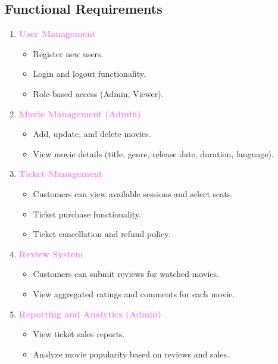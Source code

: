 \documentclass[a4paper,12pt]{article}  %
\renewcommand{\textbf}[1]{\textcolor{violet}{\bfseries #1}}
\begin{document}
\subsection{Functional Requirements}

\begin{enumerate}
    \item \textbf{User Management}
    \begin{itemize}
        \item Register new users.
        \item Login and logout functionality.
        \item Role-based access (Admin, Viewer).
    \end{itemize}
    
    
    \item \textbf{Movie Management (Admin)}
    \begin{itemize}
        \item Add, update, and delete movies.
        \item View movie details (title, genre, release date, duration, language).
    \end{itemize}
    
    
    \item \textbf{Ticket Management}
    \begin{itemize}
        \item Customers can view available sessions and select seats.
        \item Ticket purchase functionality.
        \item Ticket cancellation and refund policy.
    \end{itemize}
    
    \item \textbf{Review System}
    \begin{itemize}
        \item Customers can submit reviews for watched movies.
        \item View aggregated ratings and comments for each movie.
    \end{itemize}
    
    \item \textbf{Reporting and Analytics (Admin)}
    \begin{itemize}
        \item View ticket sales reports.
        \item Analyze movie popularity based on reviews and sales.
    \end{itemize}
\end{enumerate}
\end{document}
